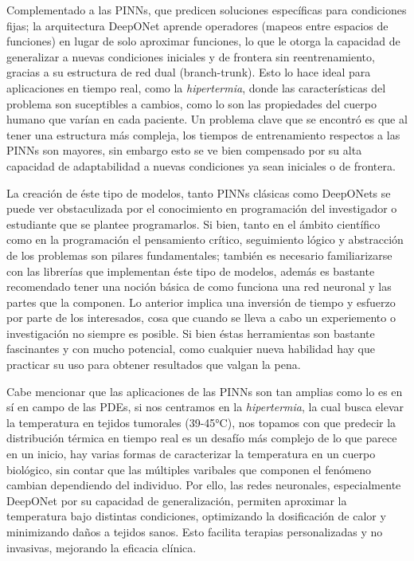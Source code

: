 \documentclass[
  spanish,
  us-letterpaper,
]{scrreprt}
\theoremstyle{definition}
\theoremstyle{plain}
\theoremstyle{remark}
\begin{document}
Complementado a las PINNs, que predicen soluciones específicas para
condiciones fijas; la arquitectura DeepONet aprende operadores (mapeos
entre espacios de funciones) en lugar de solo aproximar funciones, lo
que le otorga la capacidad de generalizar a nuevas condiciones iniciales
y de frontera sin reentrenamiento, gracias a su estructura de red dual
(branch-trunk). Esto lo hace ideal para aplicaciones en tiempo real,
como la \emph{hipertermia}, donde las características del problema son
suceptibles a cambios, como lo son las propiedades del cuerpo humano que
varían en cada paciente. Un problema clave que se encontró es que al
tener una estructura más compleja, los tiempos de entrenamiento
respectos a las PINNs son mayores, sin embargo esto se ve bien
compensado por su alta capacidad de adaptabilidad a nuevas condiciones
ya sean iniciales o de frontera.

La creación de éste tipo de modelos, tanto PINNs clásicas como DeepONets
se puede ver obstaculizada por el conocimiento en programación del
investigador o estudiante que se plantee programarlos. Si bien, tanto en
el ámbito científico como en la programación el pensamiento crítico,
seguimiento lógico y abstracción de los problemas son pilares
fundamentales; también es necesario familiarizarse con las librerías que
implementan éste tipo de modelos, además es bastante recomendado tener
una noción básica de como funciona una red neuronal y las partes que la
componen. Lo anterior implica una inversión de tiempo y esfuerzo por
parte de los interesados, cosa que cuando se lleva a cabo un
experiemento o investigación no siempre es posible. Si bien éstas
herramientas son bastante fascinantes y con mucho potencial, como
cualquier nueva habilidad hay que practicar su uso para obtener
resultados que valgan la pena.

Cabe mencionar que las aplicaciones de las PINNs son tan amplias como lo
es en sí en campo de las PDEs, si nos centramos en la
\emph{hipertermia}, la cual busca elevar la temperatura en tejidos
tumorales (39-45°C), nos topamos con que predecir la distribución
térmica en tiempo real es un desafío más complejo de lo que parece en un
inicio, hay varias formas de caracterizar la temperatura en un cuerpo
biológico, sin contar que las múltiples varibales que componen el
fenómeno cambian dependiendo del individuo. Por ello, las redes
neuronales, especialmente DeepONet por su capacidad de generalización,
permiten aproximar la temperatura bajo distintas condiciones,
optimizando la dosificación de calor y minimizando daños a tejidos
sanos. Esto facilita terapias personalizadas y no invasivas, mejorando
la eficacia clínica.
\end{document}
